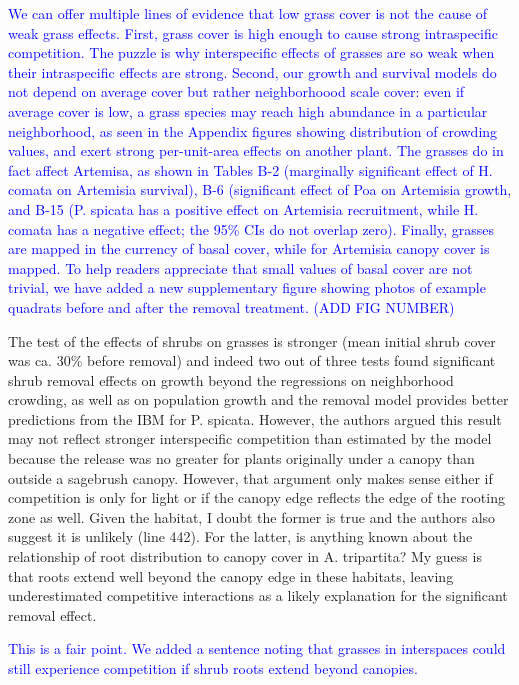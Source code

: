\documentclass[12pt]{article}
\newcommand{\response}{\textcolor{blue}}
\begin{document}
\response{We can offer multiple lines of evidence that low grass cover is not the cause of weak grass effects. 
First, grass cover is high enough to cause strong intraspecific competition. The puzzle is why interspecific effects
of grasses are so weak when their intraspecific effects are strong. Second, our growth and survival models do not
depend on average cover but rather neighborhoood scale cover: even if average cover is low, a
grass species may reach high abundance in a particular neighborhood, as seen in the Appendix figures
showing distribution of crowding values, and exert strong per-unit-area effects on another plant. The grasses do in fact
affect Artemisa, as shown in Tables B-2 (marginally significant effect of H. comata on Artemisia survival), B-6 (significant 
effect of Poa on Artemisia growth, and  B-15 (P. spicata has a positive effect on Artemisia recruitment, while H. comata
has a negative effect; the 95\% CIs do not overlap zero). Finally,
grasses are mapped in the currency of basal cover, while for Artemisia canopy cover is mapped. To help readers
appreciate that small values of basal cover are not trivial, we have added a new supplementary figure showing 
photos of example quadrats before and after the removal treatment. (ADD FIG NUMBER)  }

The test of the effects of shrubs on grasses is stronger (mean initial shrub cover was ca. 30\% before
removal) and indeed two out of three tests found significant shrub removal effects on growth beyond
the regressions on neighborhood crowding, as well as on population growth and the removal model
provides better predictions from the IBM for P. spicata. However, the authors argued this result may
not reflect stronger interspecific competition than estimated by the model because the release was no
greater for plants originally under a canopy than outside a sagebrush canopy. However, that argument
only makes sense either if competition is only for light or if the canopy edge reflects the edge of the
rooting zone as well. Given the habitat, I doubt the former is true and the authors also suggest it is
unlikely (line 442). For the latter, is anything known about the relationship of root distribution to
canopy cover in A. tripartita? My guess is that roots extend well beyond the canopy edge in these
habitats, leaving underestimated competitive interactions as a likely explanation for the significant
removal effect.

\response{This is a fair point. We added a sentence noting that grasses in interspaces could still experience competition
if shrub roots extend beyond canopies.}
\end{document}
